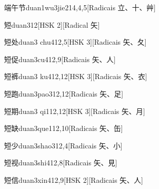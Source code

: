 \begin{entry}{端午节}{duan1wu3jie2}{14,4,5}[Radicais ⽴、⼗、⾋]
\end{entry}

\begin{entry}{短}{duan3}{12}[HSK 2][Radical ⽮]
\end{entry}

\begin{entry}{短处}{duan3 chu4}{12,5}[HSK 3][Radicais ⽮、⼡]
\end{entry}

\begin{entry}{短促}{duan3cu4}{12,9}[Radicais ⽮、⼈]
\end{entry}

\begin{entry}{短裤}{duan3 ku4}{12,12}[HSK 3][Radicais ⽮、⾐]
\end{entry}

\begin{entry}{短跑}{duan3pao3}{12,12}[Radicais ⽮、⾜]
\end{entry}

\begin{entry}{短期}{duan3 qi1}{12,12}[HSK 3][Radicais ⽮、⽉]
\end{entry}

\begin{entry}{短缺}{duan3que1}{12,10}[Radicais ⽮、⽸]
\end{entry}

\begin{entry}{短少}{duan3shao3}{12,4}[Radicais ⽮、⼩]
\end{entry}

\begin{entry}{短视}{duan3shi4}{12,8}[Radicais ⽮、⾒]
\end{entry}

\begin{entry}{短信}{duan3xin4}{12,9}[HSK 2][Radicais ⽮、⼈]
\end{entry}

